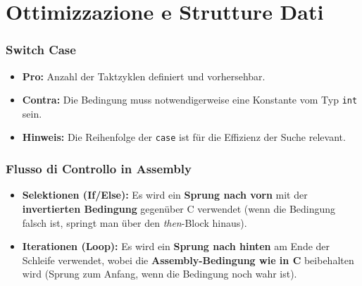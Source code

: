 \section{Ottimizzazione e Strutture Dati}

\subsubsection{Switch Case}
\begin{itemize}
    \item \textbf{Pro:} Anzahl der Taktzyklen definiert und vorhersehbar.
    \item \textbf{Contra:} Die Bedingung muss notwendigerweise eine Konstante vom Typ \texttt{int} sein.
    \item \textbf{Hinweis:} Die Reihenfolge der \texttt{case} ist für die Effizienz der Suche relevant.
\end{itemize}

\subsubsection{Flusso di Controllo in Assembly}
\begin{itemize}
    \item \textbf{Selektionen (If/Else):} Es wird ein \textbf{Sprung nach vorn} mit der \textbf{invertierten Bedingung} gegenüber C verwendet (wenn die Bedingung falsch ist, springt man über den \textit{then}-Block hinaus).
    \item \textbf{Iterationen (Loop):} Es wird ein \textbf{Sprung nach hinten} am Ende der Schleife verwendet, wobei die \textbf{Assembly-Bedingung wie in C} beibehalten wird (Sprung zum Anfang, wenn die Bedingung noch wahr ist).
\end{itemize}


